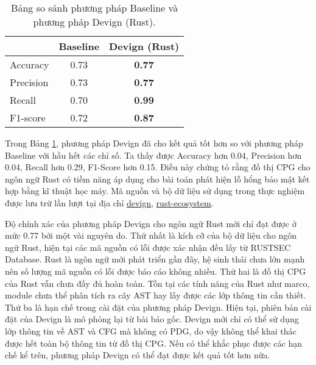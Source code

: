 \begin{table}[H]
    \centering
    \caption{Bảng so sánh phương pháp Baseline và phương pháp Devign (Rust).}
    \label{table:c5_ml}
    \begin{tabular}{l @{\hskip 3cm} c @{\hskip 3cm} c}
        \hline
         & Baseline & \textbf{Devign (Rust)} \\
        \hline
        Accuracy & 0.73 & \textbf{0.77} \\
        Precision & 0.73 & \textbf{0.77} \\
        Recall & 0.70 & \textbf{0.99} \\
        F1-score & 0.72 & \textbf{0.87} \\
        \hline
    \end{tabular}
\end{table}

Trong Bảng \ref{table:c5_ml}, phương pháp Devign đã cho kết quả tốt hơn so với phương pháp Baseline với hầu hết các chỉ số.
Ta thấy được Accuracy hơn 0.04, Precision hơn 0.04, Recall hơn 0.29, F1-Score hơn 0.15.
Điều này chứng tỏ rằng đồ thị CPG cho ngôn ngữ Rust có tiềm năng áp dụng cho bài toán phát hiện lỗ hổng bảo mật kết hợp bằng kĩ thuật học máy.
Mã nguồn và bộ dữ liệu sử dụng trong thực nghiệm được lưu trữ lần lượt tại địa chỉ \href{https://github.com/congnghiahieu/devign}{devign}, \href{https://github.com/congnghiahieu/rust-ecosystem}{rust-ecosystem}.

Độ chính xác của phương pháp Devign cho ngôn ngữ Rust mới chỉ đạt được ở mức 0.77 bởi một vài nguyên do.
Thứ nhất là kích cỡ của bộ dữ liệu cho ngôn ngữ Rust, hiện tại các mã nguồn có lỗi được xác nhận đều lấy từ RUSTSEC Database.
Rust là ngôn ngữ mới phát triển gần đây, hệ sinh thái chưa lớn mạnh nên số lượng mã nguồn có lỗi được báo cáo không nhiều.
Thứ hai là đồ thị CPG của Rust vẫn chưa đầy đủ hoàn toàn.
Tồn tại các tính năng của Rust như marco, module chưa thể phân tích ra cây AST hay lấy được các lớp thông tin cần thiết.
Thứ ba là hạn chế trong cài đặt của phương pháp Devign.
Hiện tại, phiên bản cài đặt của Devign là mô phỏng lại từ bài báo gốc.
Devign mới chỉ có thể sử dụng lớp thông tin về AST và CFG mà không có PDG, do vậy không thể khai thác được hết toàn bộ thông tin từ đồ thị CPG.
Nếu có thể khắc phục được các hạn chế kể trên, phương pháp Devign có thể đạt được kết quả tốt hơn nữa.

